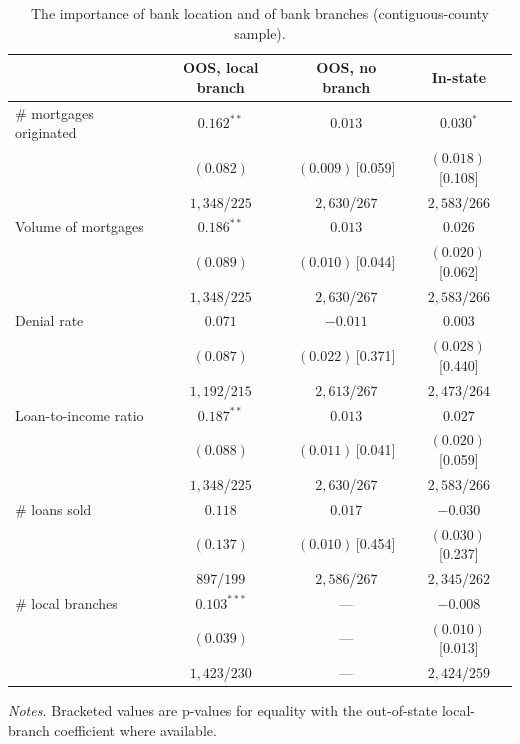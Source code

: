 \begin{table}[htbp]
  \centering
  \caption{The importance of bank location and of bank branches (contiguous-county sample).}
  \label{tab:banktype-contig}
  \small
  \begin{tabular}{lccc}
    \toprule
     & OOS, local branch & OOS, no branch & In-state \\
    \midrule
    \# mortgages originated & $0.162^{**}$ & $0.013$ & $0.030^{*}$ \\
                            & $(0.082)$ & $(0.009)$\,[0.059] & $(0.018)$\,[0.108] \\
                            & {\scriptsize $1,348$/$225$} & {\scriptsize $2,630$/$267$} & {\scriptsize $2,583$/$266$} \\
    \addlinespace
    Volume of mortgages & $0.186^{**}$ & $0.013$ & $0.026$ \\
                            & $(0.089)$ & $(0.010)$\,[0.044] & $(0.020)$\,[0.062] \\
                            & {\scriptsize $1,348$/$225$} & {\scriptsize $2,630$/$267$} & {\scriptsize $2,583$/$266$} \\
    \addlinespace
    Denial rate & $0.071$ & $-0.011$ & $0.003$ \\
                            & $(0.087)$ & $(0.022)$\,[0.371] & $(0.028)$\,[0.440] \\
                            & {\scriptsize $1,192$/$215$} & {\scriptsize $2,613$/$267$} & {\scriptsize $2,473$/$264$} \\
    \addlinespace
    Loan-to-income ratio & $0.187^{**}$ & $0.013$ & $0.027$ \\
                            & $(0.088)$ & $(0.011)$\,[0.041] & $(0.020)$\,[0.059] \\
                            & {\scriptsize $1,348$/$225$} & {\scriptsize $2,630$/$267$} & {\scriptsize $2,583$/$266$} \\
    \addlinespace
    \# loans sold & $0.118$ & $0.017$ & $-0.030$ \\
                            & $(0.137)$ & $(0.010)$\,[0.454] & $(0.030)$\,[0.237] \\
                            & {\scriptsize $897$/$199$} & {\scriptsize $2,586$/$267$} & {\scriptsize $2,345$/$262$} \\
    \addlinespace
    \# local branches & $0.103^{***}$ & --- & $-0.008$ \\
                            & $(0.039)$ & --- & $(0.010)$\,[0.013] \\
                            & {\scriptsize $1,423$/$230$} & --- & {\scriptsize $2,424$/$259$} \\
    \bottomrule
  \end{tabular}
  \begin{tablenotes}\footnotesize
  \item \emph{Notes.} Bracketed values are p-values for equality with the out-of-state local-branch coefficient where available.
  \end{tablenotes}
\end{table}

